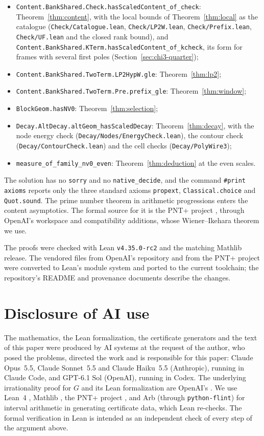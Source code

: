 \documentclass[11pt]{amsart}
\theoremstyle{definition}
\theoremstyle{remark}
\numberwithin{equation}{section}
\newcommand{\lean}[1]{\nolinkurl{#1}}
\begin{document}
\begin{itemize}
\item \lean{Content.BankShared.Check.hasScaledContent_of_check}: Theorem~\ref{thm:content}, with the local bounds of
 Theorem~\ref{thm:local} as the catalogue (\lean{Check/Catalogue.lean}, \lean{Check/LP2W.lean}, \lean{Check/Prefix.lean},
 \lean{Check/UF.lean} and the closed rank bound), and \lean{Content.BankShared.KTerm.hasScaledContent_of_kcheck}, its form
 for frames with several first poles (Section~\ref{sec:chi3-quarter});
\item \lean{Content.BankShared.TwoTerm.LP2HypW.gle}: Theorem~\ref{thm:lp2};
\item \lean{Content.BankShared.TwoTerm.Pre.prefix_gle}: Theorem~\ref{thm:window};
\item \lean{BlockGeom.hasNV0}: Theorem~\ref{thm:selection};
\item \lean{Decay.AltDecay.altGeom_hasScaledDecay}: Theorem~\ref{thm:decay}, with the node energy check
 (\lean{Decay/Nodes/EnergyCheck.lean}), the contour check (\lean{Decay/ContourCheck.lean}) and the cell checks
 (\lean{Decay/PolyWire3});
\item \lean{measure_of_family_nv0_even}: Theorem~\ref{thm:deduction} at the even scales.
\end{itemize}
The solution has no \lean{sorry} and no \lean{native_decide}, and the command \texttt{\#print axioms} reports only the
three standard axioms \lean{propext}, \lean{Classical.choice} and \lean{Quot.sound}. The prime number theorem in arithmetic
progressions enters the content asymptotics. The formal source for it is the PNT+ project \cite{PNTPlus}, through
OpenAI's workspace and compatibility additions, whose Wiener--Ikehara theorem we use.

The proofs were checked with Lean \texttt{v4.35.0-rc2} and the matching Mathlib release. The vendored files from OpenAI's
repository and from the PNT+ project were converted to Lean's module system and ported to the current toolchain; the
repository's README and provenance documents describe the changes.

\section*{Disclosure of AI use}

The mathematics, the Lean formalization, the certificate generators and the text of this paper were produced by AI systems at the request of the author, who posed the problems, directed the work and is responsible for this paper: Claude Opus~5.5, Claude Sonnet~5.5 and Claude Haiku~5.5 (Anthropic), running in Claude Code, and GPT-6.1 Sol (OpenAI), running in Codex. The underlying irrationality proof for $G$ and its Lean formalization are OpenAI's \cite{OpenAI2026}. We use Lean~4
\cite{Lean4}, Mathlib \cite{Mathlib}, the PNT+ project \cite{PNTPlus}, and Arb \cite{Arb} (through
\texttt{python-flint}) for interval arithmetic in generating certificate data, which Lean re-checks. The formal
verification in Lean is intended as an independent check of every step of the argument above.
\end{document}
